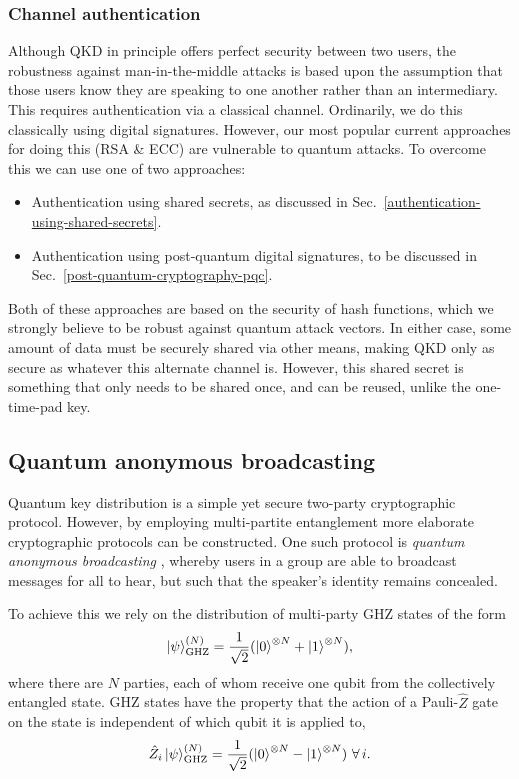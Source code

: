 \subsubsection{Channel authentication} \label{channel-authentication}

Although QKD in principle offers perfect security between two users, the robustness against man-in-the-middle attacks is based upon the assumption that those users know they are speaking to one another rather than an intermediary. This requires authentication via a classical channel. Ordinarily, we do this classically using digital signatures. However, our most popular current approaches for doing this (RSA \& ECC) are vulnerable to quantum attacks. To overcome this we can use one of two approaches:
\begin{itemize}
	\item Authentication using shared secrets, as discussed in Sec.~\ref{authentication-using-shared-secrets}.
	\item Authentication using post-quantum digital signatures, to be discussed in Sec.~\ref{post-quantum-cryptography-pqc}.
\end{itemize}
Both of these approaches are based on the security of hash functions, which we strongly believe to be robust against quantum attack vectors. In either case, some amount of data must be securely shared via other means, making QKD only as secure as whatever this alternate channel is. However, this shared secret is something that only needs to be shared once, and can be reused, unlike the one-time-pad key.

\subsection{Quantum anonymous broadcasting}

Quantum key distribution is a simple yet secure two-party cryptographic protocol. However, by employing multi-partite entanglement more elaborate cryptographic protocols can be constructed. One such protocol is \emph{quantum anonymous broadcasting} \cite{bib:QAB}, whereby users in a group are able to broadcast messages for all to hear, but such that the speaker's identity remains concealed.

To achieve this we rely on the distribution of multi-party GHZ states of the form
\begin{align}
	\ket\psi_\mathrm{GHZ}^{(N)} = \frac{1}{\sqrt{2}}(\ket{0}^{\otimes N} + \ket{1}^{\otimes N}),
\end{align}
where there are $N$ parties, each of whom receive one qubit from the collectively entangled state. GHZ states have the property that the action of a Pauli-$\hat{Z}$ gate on the state is independent of which qubit it is applied to,
\begin{align}
	\hat{Z}_i \ket\psi_\mathrm{GHZ}^{(N)} = \frac{1}{\sqrt{2}}(\ket{0}^{\otimes N} - \ket{1}^{\otimes N})\,\,\forall\, i.
\end{align}

